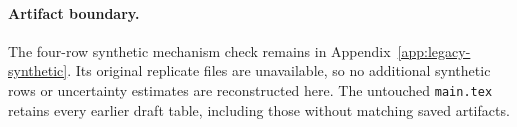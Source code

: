 \paragraph{Artifact boundary.}
The four-row synthetic mechanism check remains in Appendix~\ref{app:legacy-synthetic}.  Its original replicate files are unavailable, so no additional synthetic rows or uncertainty estimates are reconstructed here.  The untouched \texttt{main.tex} retains every earlier draft table, including those without matching saved artifacts.
